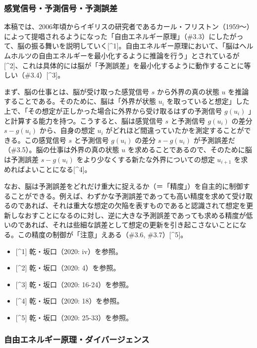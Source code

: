 \subsubsection{感覚信号・予測信号・予測誤差}\label{ux611fux899aux4fe1ux53f7ux4e88ux6e2cux4fe1ux53f7ux4e88ux6e2cux8aa4ux5dee}

本稿では、2006年頃からイギリスの研究者であるカール・フリストン（1959～）によって提唱されるようになった「自由エネルギー原理」（\#3.3）にしたがって、脳の振る舞いを説明していく{[}\^{}1{]}。自由エネルギー原理において、「脳はヘルムホルツの自由エネルギーを最小化するように推論を行う」とされているが{[}\^{}2{]}、これは具体的には脳が「予測誤差」を最小化するように動作することに等しい（\#3.4）{[}\^{}3{]}。

まず、脳の仕事とは、脳が受け取った感覚信号 \(s\) から外界の真の状態
\(u\) を推論することである。そのために、脳は「外界が状態 \(u_i\)
を取っていると想定」した上で、「その想定が正しかった場合に外界から受け取るはずの予測信号
\(g(u_i)\) 」と計算する能力を持つ。こうすると、脳は感覚信号 \(s\)
と予測信号 \(g(u_i)\) の差分 \(s-g(u_i)\) から、自身の想定 \(u_i\)
がどれほど間違っていたかを測定することができる。この感覚信号 \(s\)
と予測信号 \(g(u_i)\) の差分 \(s-g(u_i)\)
が予測誤差だ（\#3.5）。脳の仕事は外界の真の状態 \(u\)
を求めることであるので、そのために脳は予測誤差 \(s-g(u_i)\)
をより少なくする新たな外界についての想定 \(u_{i+1}\)
を求めればよいことになる{[}\^{}4{]}。

なお、脳は予測誤差をどれだけ重大に捉えるか（＝「精度」）を自主的に制御することができる。例えば、わずかな予測誤差であっても高い精度を求めて受け取るのであれば、それは重大な想定の欠陥を表すものであると認識されて想定を更新しなおすことになるのに対し、逆に大きな予測誤差であっても求める精度が低いのであれば、それは些細な誤差として想定の更新を引き起こさないことになる。この精度の制御が「注意」えある（\#3.6,
\#3.7）{[}\^{}5{]}。

\begin{itemize}
\tightlist
\item
  {[}\^{}1{]} 乾・坂口（2020: iv）を参照。
\item
  {[}\^{}2{]} 乾・坂口（2020: 4）を参照。
\item
  {[}\^{}3{]} 乾・坂口（2020: 16-24）を参照。
\item
  {[}\^{}4{]} 乾・坂口（2020: 18）を参照。
\item
  {[}\^{}5{]} 乾・坂口（2020: 25-33）を参照。
\end{itemize}

\subsubsection{自由エネルギー原理・ダイバージェンス}\label{ux81eaux7531ux30a8ux30cdux30ebux30aeux30fcux539fux7406ux30c0ux30a4ux30d0ux30fcux30b8ux30a7ux30f3ux30b9}

